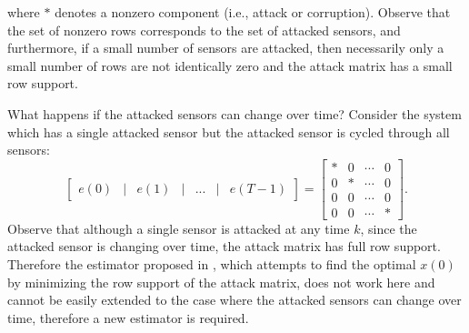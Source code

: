 \documentclass[../../thesis.tex]{subfiles}
\begin{document}
where $*$ denotes a nonzero component (i.e., attack or corruption). 
Observe that the set of nonzero rows corresponds to the set of attacked sensors, and furthermore, if a small number of sensors are attacked, then necessarily only a small number of rows are not identically zero and the attack matrix has a small row support. 

What happens if the attacked sensors can change over time? Consider the system which has a single attacked sensor but the attacked sensor is cycled through all sensors:
\begin{equation*}
	\begin{bmatrix} e(0)  & \lvert & e(1) & \lvert &  ... &  \lvert & e(T-1) \end{bmatrix} = \begin{bmatrix} * & 0 & \cdots & 0 \\
					       0 & * & \cdots & 0 \\
					       0 & 0 & \cdots & 0 \\
					       0 & 0 & \cdots & * 
			\end{bmatrix}.
\end{equation*}
Observe that although a single sensor is attacked at any time $k$, since the attacked sensor is changing over time, the attack matrix has full row support. Therefore the estimator proposed in \cite{Fawzi:2014}, which attempts to find the optimal $x(0)$ by minimizing the row support of the attack matrix, does not work here and cannot be easily extended to the case where the attacked sensors can change over time, therefore a new estimator is required.
\end{document}
